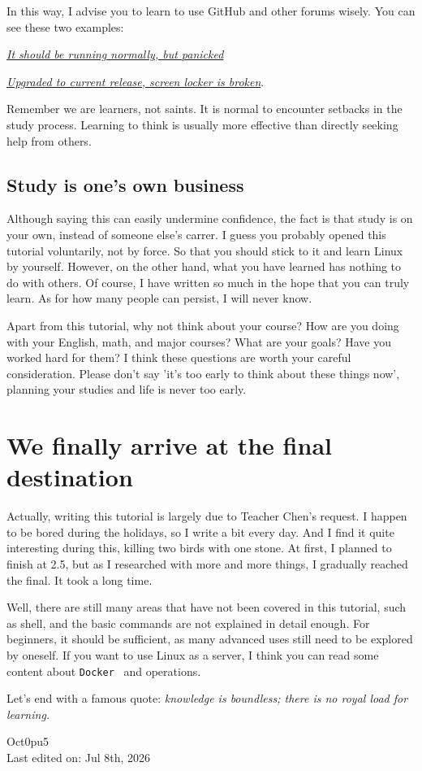 \documentclass[lang=en,color=blue,12pt]{elegantbook}
\let\oldtexttt\texttt
\renewcommand{\texttt}[1]{%
  \begingroup
  \setlength{\fboxsep}{1pt}%
  \colorbox{gray!10}{\oldtexttt{#1}}%
  \endgroup
}
\begin{document}
In this way, I advise you to learn to use GitHub and other forums
wisely. You can see these two examples:

\href{https://github.com/iffse/pay-respects/issues/34}{\textit{It should be
running normally, but panicked}}

\href{https://www.reddit.com/r/kde/comments/zlr6hb/upgraded_to_current_release_screen_locker_is/}{\textit{Upgraded
to current release, screen locker is broken}}.

Remember we are learners, not saints. It is normal to encounter
setbacks in the study process. Learning to think is usually more
effective than directly seeking help from others.

\subsection*{\textbf{Study is one's own business}}

Although saying this can easily undermine confidence, the fact is that
study is on your own, instead of someone else's carrer. I guess you probably
opened this tutorial voluntarily, not by force. So that you should stick to
it and learn Linux by yourself. However, on the other hand, what you have
learned has nothing to do with others. Of course, I have written so much in
the hope that you can truly learn. As for how many people can persist, I will
never know.

Apart from this tutorial, why not think about your course? How are you
doing with your English, math, and major courses? What are your goals?
Have you worked hard for them? I think these questions are worth your
careful consideration. Please don't say 'it's too early to think about these
things now', planning your studies and life is never too early.

\section*{\textbf{We finally arrive at the final destination}}

Actually, writing this tutorial is largely due to Teacher
Chen's request. I happen to be bored during the holidays, so I write a bit
every day. And I find it quite interesting during this, killing two birds
with one stone. At first, I planned to finish at 2.5, but as I researched
with more and more things, I gradually reached the final. It took a long time.

Well, there are still many areas that have not been covered in this
tutorial, such as shell, and the basic commands are not explained in
detail enough. For beginners, it should be sufficient, as many advanced
uses still need to be explored by oneself. If you want to use Linux as a
server, I think you can read some content about \texttt{Docker}\ and operations.

Let's end with a famous quote: \emph{knowledge is boundless; there is no royal
load for learning.}

\begin{flushright}
Oct0pu5\\
Last edited on: Jul 8th, 2026
\end{flushright}
\end{document}

